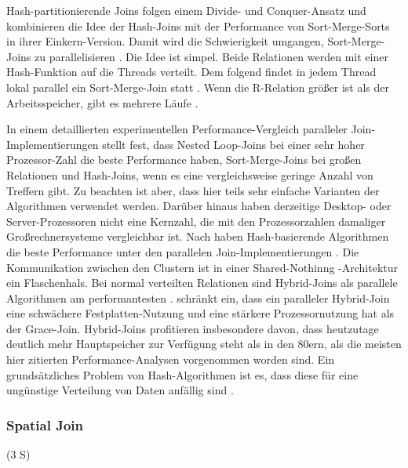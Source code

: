 \documentclass[a4paper,12pt,twoside]{article}
\begin{document}
Hash-partitionierende Joins folgen einem Divide- und Conquer-Ansatz und kombinieren die Idee der Hash-Joins mit der Performance von Sort-Merge-Sorts in ihrer Einkern-Version. Damit wird die Schwierigkeit umgangen, Sort-Merge-Joins zu parallelisieren {\autocite[S. 75ff]{Mishra199}}. Die Idee ist simpel. Beide Relationen werden mit einer Hash-Funktion auf die Threads verteilt. Dem folgend findet in jedem Thread lokal parallel ein Sort-Merge-Join statt {\autocite{Richardson1987}}. Wenn die R-Relation größer ist als der Arbeitsspeicher, gibt es mehrere Läufe {\autocite{Lu1990}}.

In einem detaillierten experimentellen Performance-Vergleich paralleler Join-Implementierungen stellt {\textcite{Valduriez1984}} fest, dass Nested Loop-Joins bei einer sehr hoher Prozessor-Zahl die beste Performance haben, Sort-Merge-Joins bei großen Relationen und Hash-Joins, wenn es eine vergleichsweise geringe Anzahl von Treffern gibt. Zu beachten ist aber, dass hier teils sehr einfache Varianten der Algorithmen verwendet werden. Darüber hinaus haben derzeitige Desktop- oder Server-Prozessoren nicht eine Kernzahl, die mit den Prozessorzahlen damaliger Großrechnersysteme vergleichbar ist. Nach {\textcite{Richardson1987}} haben Hash-basierende Algorithmen die beste Performance unter den parallelen Join-Implementierungen {\autocite[vgl. auch ]{Gerber1986}}. Die Kommunikation zwischen den Clustern ist in einer Shared-Nothinng%
-Architektur ein Flaschenhals. Bei normal verteilten Relationen sind Hybrid-Joins als parallele Algorithmen am performantesten {\autocite{Schneider1989}}. {\textcite{DeWitt1985}} schränkt ein, dass ein paralleler Hybrid-Join eine schwächere Festplatten-Nutzung und eine stärkere Prozessornutzung hat als der Grace-Join. Hybrid-Joins profitieren insbesondere davon, dass heutzutage deutlich mehr Hauptspeicher zur Verfügung steht als in den 80ern, als die meisten hier zitierten Performance-Analysen vorgenommen worden sind. Ein grundsätzliches Problem von Hash-Algorithmen ist es, dass diese für eine ungünstige Verteilung von Daten anfällig sind {\autocite{Lakshmi1990}}.

\subsubsection{Spatial Join} (3  S)
\label{Spatial Join} 
\end{document}
